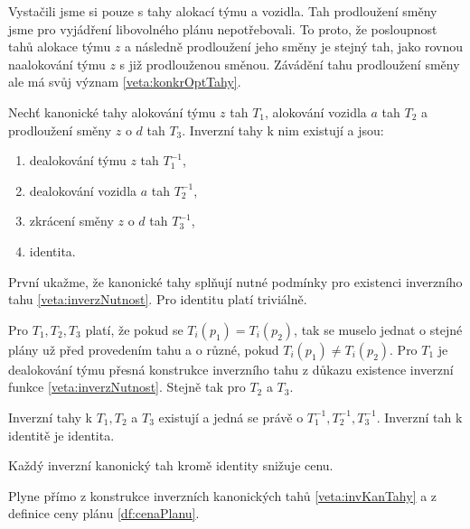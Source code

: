 Vystačili jsme si pouze s tahy alokací týmu a vozidla.
Tah prodloužení směny jsme pro vyjádření libovolného plánu nepotřebovali.
To proto, že posloupnost tahů alokace týmu $z$ a následně prodloužení jeho směny je stejný tah, jako rovnou naalokování týmu $z$ s již prodlouženou směnou.
Závádění tahu prodloužení směny ale má svůj význam \ref{veta:konkrOptTahy}.

\begin{veta}\label{veta:invKanTahy}
  Nechť kanonické tahy alokování týmu $z$ tah $T_1$, alokování vozidla $a$ tah $T_2$ a prodloužení směny $z$ o $d$ tah $T_3$.
  Inverzní tahy k nim existují a jsou:

  \begin{enumerate}
    \item
      dealokování týmu $z$ tah $T_1^{-1}$,

    \item
      dealokování vozidla $a$ tah $T_2^{-1}$,

    \item
      zkrácení směny $z$ o $d$ tah $T_3^{-1}$,

    \item
      identita.
  \end{enumerate}
\end{veta}
\begin{dukaz}
  První ukažme, že kanonické tahy splňují nutné podmínky pro existenci inverzního tahu \ref{veta:inverzNutnost}.
  Pro identitu platí triviálně.

  Pro $T_1, T_2, T_3$ platí, že pokud se $T_i(p_1) = T_i(p_2)$, tak se muselo jednat o stejné plány už před provedením tahu a o různé, pokud $T_i(p_1) \neq T_i(p_2)$.
  Pro $T_1$ je dealokování týmu přesná konstrukce inverzního tahu z důkazu existence inverzní funkce \ref{veta:inverzNutnost}.
  Stejně tak pro $T_2$ a $T_3$.

  Inverzní tahy k $T_1, T_2$ a $T_3$ existují a jedná se právě o $T_1^{-1}, T_2^{-1}, T_3^{-1}$.
  Inverzní tah k identitě je identita.
\end{dukaz}

\begin{veta}\label{veta:kazdyInvSnizujeCenu}
  Každý inverzní kanonický tah kromě identity snižuje cenu.
\end{veta}
\begin{dukaz}
  Plyne přímo z konstrukce inverzních kanonických tahů \ref{veta:invKanTahy} a z definice ceny plánu \ref{df:cenaPlanu}.
\end{dukaz}

